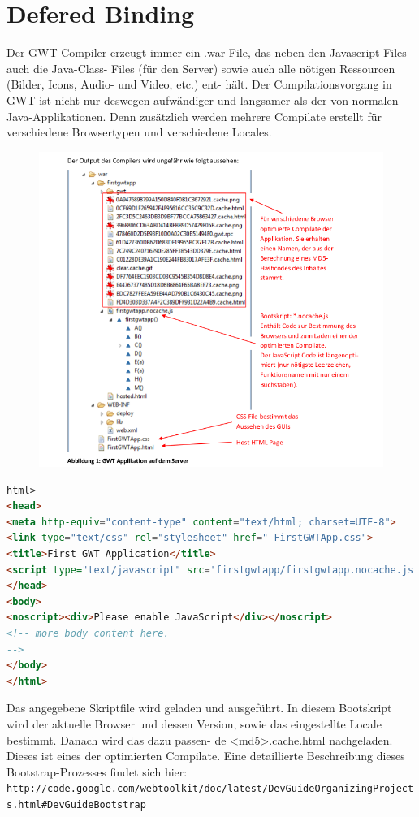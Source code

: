 \documentclass[a4paper,10pt]{scrreprt}
\begin{document}
\section{Defered Binding}
Der GWT-Compiler erzeugt immer ein .war-File, das neben den Javascript-Files auch die Java-Class-
Files (für den Server) sowie auch alle nötigen Ressourcen (Bilder, Icons, Audio- und Video, etc.) ent-
hält. Der Compilationsvorgang in GWT ist nicht nur deswegen aufwändiger und langsamer als der von
normalen Java-Applikationen. Denn zusätzlich werden mehrere Compilate erstellt für verschiedene
Browsertypen und verschiedene Locales.
\begin{figure}[h]
 \centering
 \includegraphics[scale=0.6]{./dbind.png}
\end{figure}
\begin{lstlisting}[caption=GWT Einstiegsseite,language=html]
 html>
<head>
<meta http-equiv="content-type" content="text/html; charset=UTF-8">
<link type="text/css" rel="stylesheet" href=" FirstGWTApp.css">
<title>First GWT Application</title>
<script type="text/javascript" src='firstgwtapp/firstgwtapp.nocache.js'/>
</head>
<body>
<noscript><div>Please enable JavaScript</div></noscript>
<!-- more body content here.
-->
</body>
</html>
\end{lstlisting}
Das angegebene Skriptfile wird geladen und ausgeführt. In diesem Bootskript wird der aktuelle
Browser und dessen Version, sowie das eingestellte Locale bestimmt. Danach wird das dazu passen-
de <md5>.cache.html nachgeladen. Dieses ist eines der optimierten Compilate.
Eine detaillierte Beschreibung dieses Bootstrap-Prozesses findet sich hier:
\texttt{http://code.google.com/webtoolkit/doc/latest/DevGuideOrganizingProjects.html\#DevGuideBootstrap}
\end{document}
